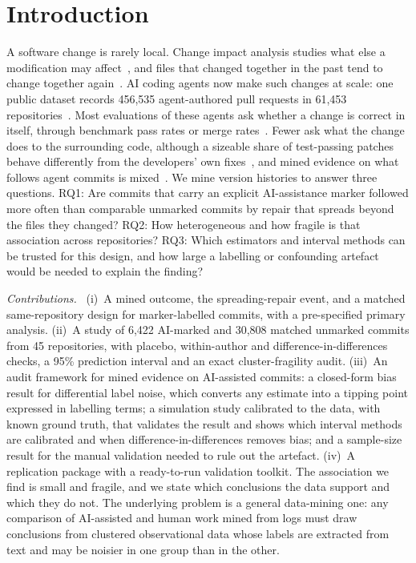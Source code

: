 \documentclass[runningheads]{llncs}
\newcommand{\runin}[1]{\par\textit{#1}\ }
\begin{document}
\section{Introduction}
A software change is rarely local. Change impact analysis studies what else a modification may affect~\cite{arnold1996}, and files that changed together in the past tend to change together again~\cite{zimmermann2004}. AI coding agents now make such changes at scale: one public dataset records 456,535 agent-authored pull requests in 61,453 repositories~\cite{li2025}. Most evaluations of these agents ask whether a change is correct in itself, through benchmark pass rates or merge rates~\cite{jimenez2024,watanabe2026}. Fewer ask what the change does to the surrounding code, although a sizeable share of test-passing patches behave differently from the developers' own fixes~\cite{wang2026}, and mined evidence on what follows agent commits is mixed~\cite{khosravani2026,kraishan2026,xia2026}. We mine version histories to answer three questions. RQ1: Are commits that carry an explicit AI-assistance marker followed more often than comparable unmarked commits by repair that spreads beyond the files they changed? RQ2: How heterogeneous and how fragile is that association across repositories? RQ3: Which estimators and interval methods can be trusted for this design, and how large a labelling or confounding artefact would be needed to explain the finding?

\runin{Contributions.} (i)~A mined outcome, the spreading-repair event, and a matched same-repository design for marker-labelled commits, with a pre-specified primary analysis. (ii)~A study of 6,422 AI-marked and 30,808 matched unmarked commits from 45 repositories, with placebo, within-author and difference-in-differences checks, a 95\% prediction interval and an exact cluster-fragility audit. (iii)~An audit framework for mined evidence on AI-assisted commits: a closed-form bias result for differential label noise, which converts any estimate into a tipping point expressed in labelling terms; a simulation study calibrated to the data, with known ground truth, that validates the result and shows which interval methods are calibrated and when difference-in-differences removes bias; and a sample-size result for the manual validation needed to rule out the artefact. (iv)~A replication package with a ready-to-run validation toolkit. The association we find is small and fragile, and we state which conclusions the data support and which they do not. The underlying problem is a general data-mining one: any comparison of AI-assisted and human work mined from logs must draw conclusions from clustered observational data whose labels are extracted from text and may be noisier in one group than in the other.
\end{document}
